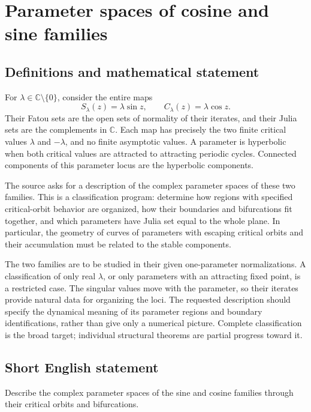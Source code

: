 \documentclass[11pt,a4paper]{article}
\begin{document}
\section*{Parameter spaces of cosine and sine families}\label{statement}

\subsection{Definitions and mathematical statement}
For $\lambda\in\mathbb C\setminus\{0\}$, consider the entire maps
\[
 S_\lambda(z)=\lambda\sin z,\qquad
 C_\lambda(z)=\lambda\cos z.
\]
Their Fatou sets are the open sets of normality of their iterates,
and their Julia sets are the complements in $\mathbb C$. Each map
has precisely the two finite critical values $\lambda$ and
$-\lambda$, and no finite asymptotic values. A parameter is
hyperbolic when both critical values are attracted to attracting
periodic cycles. Connected components of this parameter locus are
the hyperbolic components.

The source asks for a description of the complex parameter spaces
of these two families. This is a classification program: determine
how regions with specified critical-orbit behavior are organized,
how their boundaries and bifurcations fit together, and which
parameters have Julia set equal to the whole plane. In particular,
the geometry of curves of parameters with escaping critical orbits
and their accumulation must be related to the stable components.

The two families are to be studied in their given one-parameter
normalizations. A classification of only real $\lambda$, or only
parameters with an attracting fixed point, is a restricted case.
The singular values move with the parameter, so their iterates
provide natural data for organizing the loci. The requested
description should specify the dynamical meaning of its parameter
regions and boundary identifications, rather than give only a
numerical picture. Complete classification is the broad target;
individual structural theorems are partial progress toward it.
\subsection{Short English statement}
Describe the complex parameter spaces of the sine and cosine families through their critical orbits and bifurcations.
\end{document}
